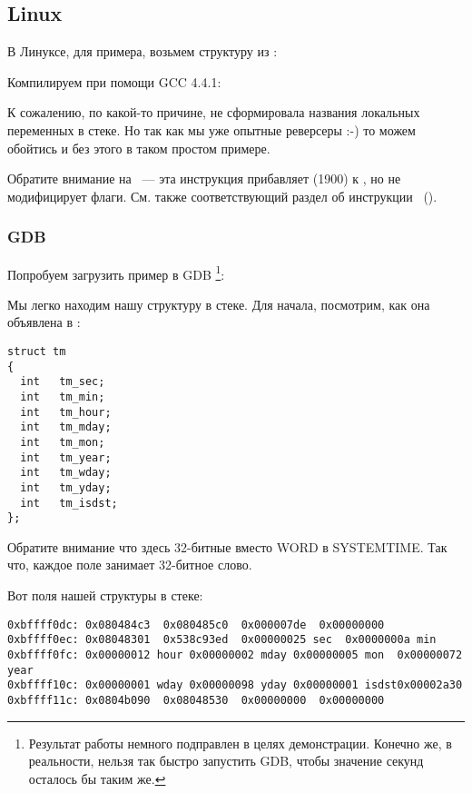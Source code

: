 ﻿\subsection{Linux}

В Линуксе, для примера, возьмем структуру  из :



Компилируем при помощи GCC 4.4.1:



К сожалению, по какой-то причине, \IDA не сформировала названия локальных переменных в стеке. 
Но так как мы уже опытные реверсеры :-) то можем обойтись и без этого в таком простом примере.

Обратите внимание на  ~--- эта инструкция прибавляет  (1900) к \EAX, 
но не модифицирует флаги. См. также соответствующий раздел об инструкции \LEA{}~().


\subsubsection{GDB}

Попробуем загрузить пример в GDB
\footnote{Результат работы  немного подправлен в целях демонстрации.
Конечно же, в реальности, нельзя так быстро запустить GDB, чтобы значение секунд осталось бы таким же.}:



Мы легко находим нашу структуру в стеке.
Для начала, посмотрим, как она объявлена в :

\begin{lstlisting}[caption=time.h, label=struct_tm]
struct tm
{
  int	tm_sec;
  int	tm_min;
  int	tm_hour;
  int	tm_mday;
  int	tm_mon;
  int	tm_year;
  int	tm_wday;
  int	tm_yday;
  int	tm_isdst;
};
\end{lstlisting}

Обратите внимание что здесь 32-битные \Tint вместо WORD в SYSTEMTIME.
Так что, каждое поле занимает 32-битное слово.

Вот поля нашей структуры в стеке:

\begin{lstlisting}
0xbffff0dc:	0x080484c3	0x080485c0	0x000007de	0x00000000
0xbffff0ec:	0x08048301	0x538c93ed	0x00000025 sec	0x0000000a min
0xbffff0fc:	0x00000012 hour	0x00000002 mday	0x00000005 mon 	0x00000072 year
0xbffff10c:	0x00000001 wday	0x00000098 yday	0x00000001 isdst0x00002a30
0xbffff11c:	0x0804b090	0x08048530	0x00000000	0x00000000
\end{lstlisting}

